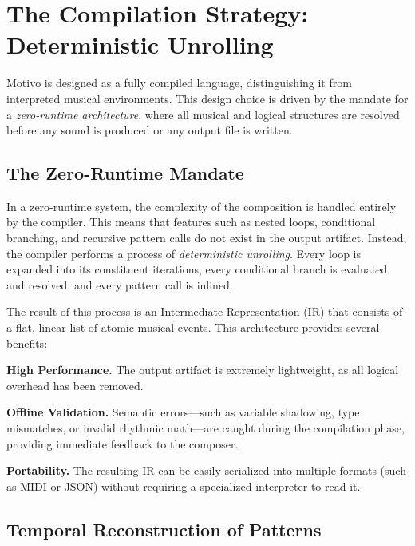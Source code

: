 
\section{The Compilation Strategy: Deterministic Unrolling}\label{detail-sec:compilation-strategy}

Motivo is designed as a fully compiled language, distinguishing it from interpreted musical environments.
This design choice is driven by the mandate for a \textit{zero-runtime architecture}, where all musical and logical
structures are resolved before any sound is produced or any output file is written.

\subsection{The Zero-Runtime Mandate}\label{detail-subsec:the-zero-runtime-mandate}

In a zero-runtime system, the complexity of the composition is handled entirely by the compiler.
This means that features such as nested loops, conditional branching, and recursive pattern calls do not exist in the
output artifact.
Instead, the compiler performs a process of \textit{deterministic unrolling}.
Every loop is expanded into its constituent iterations, every conditional branch is evaluated and resolved, and every
pattern call is inlined.

The result of this process is an Intermediate Representation (IR) that consists of a flat, linear list of atomic musical
events.
This architecture provides several benefits:

\noindent \textbf{High Performance.} The output artifact is extremely lightweight, as all logical overhead has been
removed.

\noindent \textbf{Offline Validation.} Semantic errors---such as variable shadowing, type mismatches, or
invalid rhythmic
math---are caught during the compilation phase, providing immediate feedback to the composer.

\noindent \textbf{Portability.} The resulting IR can be easily serialized into multiple formats (such as MIDI or JSON)
without requiring a specialized interpreter to read it.

\subsection{Temporal Reconstruction of Patterns}\label{detail-subsec:temporal-reconstruction-of-patterns}

